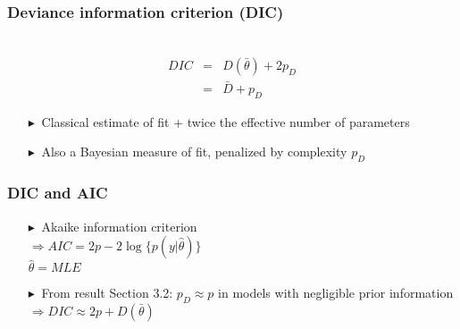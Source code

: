 \documentclass[9pt]{beamer}  %
\newcommand{\bluetri}{\textcolor{Beaverblue}{$\blacktriangleright \ $}}
\begin{document}
\begin{frame}
\frametitle{Deviance information criterion (DIC)}


\begin{block}{\textcolor{white}{Definition}}
    \begin{eqnarray}
        DIC & = & D(\bar{\theta}) + 2p_D \nonumber\\
            & = & \bar{D} + p_D \nonumber
    \end{eqnarray}
\end{block}


\begin{itemize}
    \item[\bluetri] Classical estimate of fit + twice the effective number of parameters
    \vspace{0.2cm}
    \item[\bluetri] Also a Bayesian measure of fit, penalized by complexity $p_D$
\end{itemize}


\end{frame}


\begin{frame}
\frametitle{DIC and AIC}

\begin{itemize}
    \item[\bluetri] Akaike information criterion \\ $\Longrightarrow AIC = 2p - 2\log\{p(y|\hat{\theta})\}$ \\ $\hat{\theta} = MLE$
    \vspace{0.2cm}
    \item[\bluetri] From result Section 3.2: $p_D \approx p$ in models with negligible prior information \\ $\Longrightarrow DIC \approx 2p + D(\bar{\theta})$
\end{itemize}


\end{frame}
\end{document}
